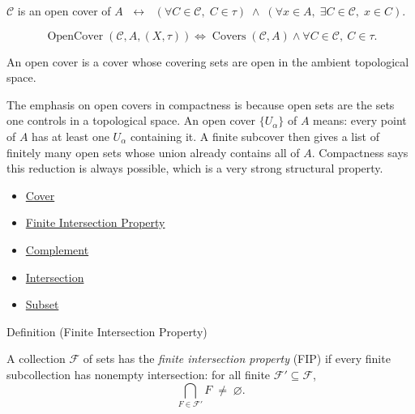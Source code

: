 \begin{remark*}
$\mathcal{C}$ is an open cover of $A$ $\;\leftrightarrow\;$ $(\forall C \in \mathcal{C},\; C \in \tau) \;\wedge\; (\forall x \in A,\; \exists C \in \mathcal{C},\; x \in C)$.
\end{remark*}

\begin{remark*}
\[
  \operatorname{OpenCover}(\mathcal{C},A,(X,\tau))
  \iff
  \operatorname{Covers}(\mathcal{C},A)
  \wedge
  \forall C\in\mathcal{C},\ C\in\tau.
\]
\end{remark*}

\begin{remark*}[Interpretation]
An open cover is a cover whose covering sets are open in the ambient
topological space.
\end{remark*}

\begin{remark*}[Exposition]
The emphasis on open covers in compactness is because open sets are the
sets one controls in a topological space. An open cover $\{U_\alpha\}$ of
$A$ means: every point of $A$ has at least one $U_\alpha$ containing it. A
finite subcover then gives a list of finitely many open sets whose union
already contains all of $A$. Compactness says this reduction is always
possible, which is a very strong structural property.
\end{remark*}

\begin{dependencies}
\begin{itemize}
  \item \hyperref[def:cover-full]{Cover}
  \item \hyperref[def:fip]{Finite Intersection Property}
  \item \hyperref[def:complement]{Complement}
  \item \hyperref[def:intersection]{Intersection}
  \item \hyperref[def:subset]{Subset}
\end{itemize}
\end{dependencies}


\begin{definitionbox}{Definition (Finite Intersection Property)}
\begin{definition}\label{def:fip}
A collection $\mathcal{F}$ of sets has the \emph{finite intersection
property} (FIP) if every finite subcollection has nonempty intersection:
for all finite $\mathcal{F}' \subseteq \mathcal{F}$,
\[
\bigcap_{F \in \mathcal{F}'} F \;\neq\; \varnothing.
\]
\end{definition}
\end{definitionbox}

